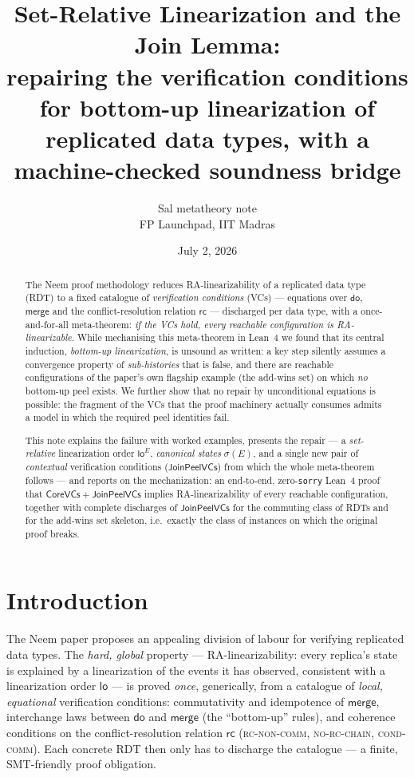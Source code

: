 \documentclass[11pt]{article}
\title{\bfseries Set-Relative Linearization and the Join Lemma:\\
\large repairing the verification conditions for bottom-up linearization of
replicated data types, with a machine-checked soundness bridge}
\author{Sal metatheory note\\ \small FP Launchpad, IIT Madras}
\date{July 2, 2026}
\newcommand{\Merge}{\mathsf{merge}}
\newcommand{\loE}[1]{\mathsf{lo}^{#1}}
\newcommand{\co}{\mathsf{CoreVCs}}
\newcommand{\jp}{\mathsf{JoinPeelVCs}}
\newcommand{\lean}[1]{\texttt{#1}}
\begin{document}
\maketitle

\begin{abstract}
\noindent
The Neem proof methodology reduces RA-linearizability of a replicated data
type (RDT) to a fixed catalogue of \emph{verification conditions} (VCs) ---
equations over $\mathsf{do}$, $\Merge$ and the conflict-resolution relation
$\mathsf{rc}$ --- discharged per data type, with a once-and-for-all
meta-theorem: \emph{if the VCs hold, every reachable configuration is
RA-linearizable}. While mechanising this meta-theorem in Lean~4 we found
that its central induction, \emph{bottom-up linearization}, is unsound as
written: a key step silently assumes a convergence property of
\emph{sub-histories} that is false, and there are reachable configurations
of the paper's own flagship example (the add-wins set) on which \emph{no}
bottom-up peel exists. We further show that no repair by unconditional
equations is possible: the fragment of the VCs that the proof machinery
actually consumes admits a model in which the required peel identities
fail.

This note explains the failure with worked examples, presents the repair
--- a \emph{set-relative} linearization order $\loE{E}$, \emph{canonical
states} $\sigma(E)$, and a single new pair of \emph{contextual}
verification conditions ($\jp$) from which the whole meta-theorem follows
--- and reports on the mechanization: an end-to-end, zero-\lean{sorry}
Lean~4 proof that $\co + \jp$ implies RA-linearizability of every reachable
configuration, together with complete discharges of $\jp$ for the
commuting class of RDTs and for the add-wins set skeleton, i.e.\ exactly
the class of instances on which the original proof breaks.
\end{abstract}

\section{Introduction}

The Neem paper proposes an appealing division of labour for verifying
replicated data types. The \emph{hard, global} property ---
RA-linearizability: every replica's state is explained by a
linearization of the events it has observed, consistent with a
linearization order $\mathsf{lo}$ --- is proved \emph{once}, generically,
from a catalogue of \emph{local, equational} verification conditions:
commutativity and idempotence of $\Merge$, interchange laws between
$\mathsf{do}$ and $\Merge$ (the ``bottom-up'' rules), and coherence
conditions on the conflict-resolution relation $\mathsf{rc}$
(\textsc{rc-non-comm}, \textsc{no-rc-chain}, \textsc{cond-comm}). Each
concrete RDT then only has to discharge the catalogue --- a finite,
SMT-friendly proof obligation.
\end{document}
